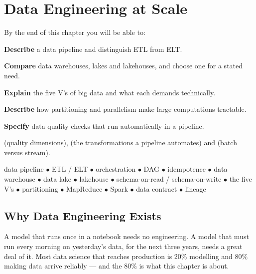 \chapter{Data Engineering at Scale}\label{ch:dataeng}

\begin{outcomes}
By the end of this chapter you will be able to:
\begin{tight}
  \item \textbf{Describe} a data pipeline and distinguish ETL from ELT.
  \item \textbf{Compare} data warehouses, lakes and lakehouses, and choose one for a stated need.
  \item \textbf{Explain} the five V's of big data and what each demands technically.
  \item \textbf{Describe} how partitioning and parallelism make large computations tractable.
  \item \textbf{Specify} data quality checks that run automatically in a pipeline.
\end{tight}
\end{outcomes}

\begin{prereq}
 (quality dimensions),  (the transformations a
pipeline automates) and  (batch versus stream).
\end{prereq}

\begin{keyterms}
data pipeline $\bullet$ ETL / ELT $\bullet$ orchestration $\bullet$ DAG $\bullet$
idempotence $\bullet$ data warehouse $\bullet$ data lake $\bullet$ lakehouse
$\bullet$ schema-on-read / schema-on-write $\bullet$ the five V's $\bullet$
partitioning $\bullet$ MapReduce $\bullet$ Spark $\bullet$ data contract
$\bullet$ lineage
\end{keyterms}

\section{Why Data Engineering Exists}

\begin{conceptbox}
A model that runs once in a notebook needs no engineering. A model that must run
every morning on yesterday's data, for the next three years, needs a great deal of
it. Most data science that reaches production is 20\% modelling and 80\% making
data arrive reliably --- and the 80\% is what this chapter is about.
\end{conceptbox}

